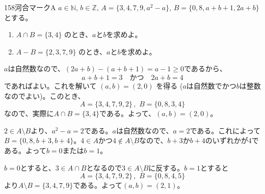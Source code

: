 \begin{thm}{158}{}{河合マークA}
 $a\in\mathbb{N}$, $b\in\mathbb{Z}$, $A=\{3, 4, 7, 9, a^2-a\}$, $B=\{0, 8, a+b+1, 2a+b\}$ とする。
 \begin{enumerate}
  \item $A\cap B = \{3, 4\}$ のとき、$a$と$b$を求めよ。
  \item $A-B = \{2, 3, 7, 9\}$ のとき、$a$と$b$を求めよ。
 \end{enumerate}
\end{thm}

$a$は自然数なので、$(2a+b)-(a+b+1)=a-1\ge 0$であるから、
\[ a+b+1=3 \quad\text{かつ}\quad 2a+b=4 \]
であればよい。これを解いて $(a, b)=(2, 0)$ を得る ($a$は自然数でかつ$b$は整数なのでよい)。このとき、
\[ A=\{3, 4, 7, 9, 2\} \,,\,\, B=\{0, 8, 3, 4\} \]
なので、実際に$A\cap B=\{3, 4\}$である。よって、$(a, b)=(2, 0)$。

$2\in A\setminus B$より、$a^2-a=2$である。$a$は自然数なので、$a=2$である。これによって$B=\{0, 8, b+3, b+4\}$。$4\in A$かつ$4\notin A\setminus B$なので、$b+3$か$b+4$のいずれかが4である。よって$b=0$または$b=1$。

$b=0$とすると、$3\in A\cap B$となるので$3\in A\setminus B$に反する。$b=1$とすると
\[ A=\{3, 4, 7, 9, 2\} \,,\,\, B=\{0, 8, 4, 5\} \]
より$A\setminus B=\{3, 4, 7, 9\}$である。よって$(a, b)=(2, 1)$。